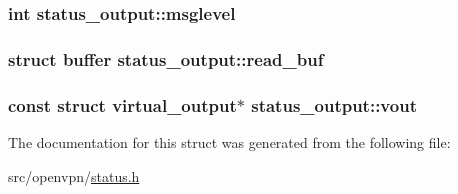 \subsubsection[{msglevel}]{\setlength{\rightskip}{0pt plus 5cm}int status\+\_\+output\+::msglevel}\label{structstatus__output_ad334b9226ff6fc50ac17df21dd35f527}
\hypertarget{structstatus__output_a052edef1b995f0e73bc5b1156d35d457}{}
\subsubsection[{read\+\_\+buf}]{\setlength{\rightskip}{0pt plus 5cm}struct {\bf buffer} status\+\_\+output\+::read\+\_\+buf}\label{structstatus__output_a052edef1b995f0e73bc5b1156d35d457}
\hypertarget{structstatus__output_a5fe1214183abc62677c6a661d542605d}{}
\subsubsection[{vout}]{\setlength{\rightskip}{0pt plus 5cm}const struct {\bf virtual\+\_\+output}$\ast$ status\+\_\+output\+::vout}\label{structstatus__output_a5fe1214183abc62677c6a661d542605d}


The documentation for this struct was generated from the following file\+:\begin{DoxyCompactItemize}
\item 
src/openvpn/\hyperlink{status_8h}{status.\+h}\end{DoxyCompactItemize}
